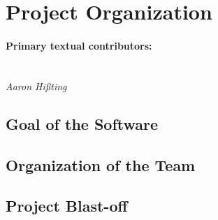 \section{Project Organization}
\label{sec:project_organization}

\paragraph{Primary textual contributors:}
\mbox{}\\\emph{Aaron Hißting}

\subsection{Goal of the Software}


\subsection{Organization of the Team}


\subsection{Project Blast-off}

